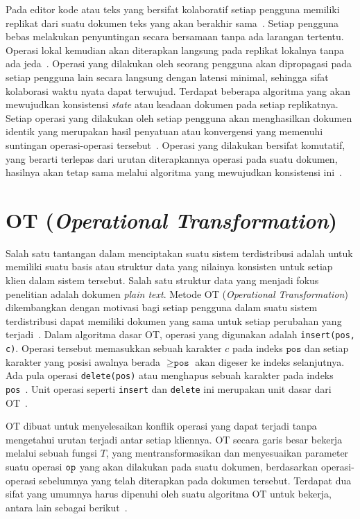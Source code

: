 Pada editor kode atau teks yang bersifat kolaboratif setiap pengguna memiliki replikat dari suatu dokumen teks yang akan berakhir sama~\citep{Sun1998, Sun2004}. Setiap pengguna bebas melakukan penyuntingan secara bersamaan tanpa ada larangan tertentu. Operasi lokal kemudian akan diterapkan langsung pada replikat lokalnya tanpa ada jeda~\citep{attiya2016specification, Lv2015}. Operasi yang dilakukan oleh seorang pengguna akan dipropagasi pada setiap pengguna lain secara langsung dengan latensi minimal, sehingga sifat kolaborasi waktu nyata dapat terwujud. Terdapat beberapa algoritma yang akan mewujudkan konsistensi \textit{state} atau keadaan dokumen pada setiap replikatnya. Setiap operasi yang dilakukan oleh setiap pengguna akan menghasilkan dokumen identik yang merupakan hasil penyatuan atau konvergensi yang memenuhi suntingan operasi-operasi tersebut~\citep{Sun1998, Sun2004, Sun2019First, Sun2019third}. Operasi yang dilakukan bersifat komutatif, yang berarti terlepas dari urutan diterapkannya operasi pada suatu dokumen, hasilnya akan tetap sama melalui algoritma yang mewujudkan konsistensi ini~\citep{Sun1998}.

\section{OT (\textit{Operational Transformation})}
\label{subsec:OT}

Salah satu tantangan dalam menciptakan suatu sistem terdistribusi adalah untuk memiliki suatu basis atau struktur data yang nilainya konsisten untuk setiap klien dalam sistem tersebut. Salah satu struktur data yang menjadi fokus penelitian adalah dokumen \textit{plain text}. Metode OT (\textit{Operational Transformation}) dikembangkan dengan motivasi bagi setiap pengguna dalam suatu sistem terdistribusi dapat memiliki dokumen yang sama untuk setiap perubahan yang terjadi~\citep{Sun1998}. Dalam algoritma dasar OT, operasi yang digunakan adalah \texttt{insert(pos, c)}. Operasi tersebut memasukkan sebuah karakter $c$ pada indeks $\texttt{pos}$ dan setiap karakter yang posisi awalnya berada $\geq \texttt{pos}$ akan digeser ke indeks selanjutnya. Ada pula operasi \texttt{delete(pos)} atau menghapus sebuah karakter pada indeks \texttt{pos}~\citep{OTOverview1}. Unit operasi seperti \texttt{insert} dan \texttt{delete} ini merupakan unit dasar dari OT~\citep{OTOverview1}.

OT dibuat untuk menyelesaikan konflik operasi yang dapat terjadi tanpa mengetahui urutan terjadi antar setiap kliennya. OT secara garis besar bekerja melalui sebuah fungsi $T$, yang mentransformasikan dan menyesuaikan parameter suatu operasi $\texttt{op}$ yang akan dilakukan pada suatu dokumen, berdasarkan operasi-operasi sebelumnya yang telah diterapkan pada dokumen tersebut. Terdapat dua sifat yang umumnya harus dipenuhi oleh suatu algoritma OT untuk bekerja, antara lain sebagai berikut~\citep{crdtLecture, OTOverview1, Li2004, Ressel1996}.

